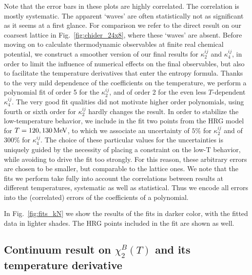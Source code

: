 \documentclass[aps,prd,twocolumn,superscriptaddress]{revtex4-2}
\newcommand{\MeV}{\, {\rm MeV}}
\begin{document}
Note that the error bars in these plots are highly correlated. The correlation
is mostly systematic. The apparent `waves' are often statistically not 
as significant as it seems at a first glance. For comparison we refer to the
direct result on our coarsest lattice in Fig.~\ref{fig:chider_24x8},
where these `waves' are absent.
Before moving on to calculate thermodynamic observables at finite real
chemical potential, we construct a smoother version of our final results for
$\kappa_2^{ij}$ and $\kappa_4^{ij}$, in order to limit the influence of
numerical effects on the final observables, but also to facilitate the
temperature derivatives that enter the entropy formula.
Thanks to the very mild dependence of the coefficients 
on the temperature, we perform a polynomial fit of order 5 for the
$\kappa_2^{ij}$, and of order 2 for the even less $T$-dependent
$\kappa_4^{ij}$. The very good fit qualities did not motivate higher
order polynomials, using fourth or sixth order for $\kappa_2^{ij}$ hardly
changes the result.  In order to stabilize the low-temperature behavior, we
include in the fit two points from the HRG model for $T = 120, 130 \MeV$, to
which we associate an uncertainty of $5\%$ for $\kappa_2^{ij}$ and of $300\%$
for $\kappa_4^{ij}$.  The choice of these particular values for the
uncertainties is uniquely guided by the necessity of placing a constraint on
the low-T behavior, while avoiding to drive the fit too strongly. For this
reason, these arbitrary errors are chosen to be smaller, but comparable to the
lattice ones. We note that the fits we perform take fully into account the
correlations between results at different temperatures, systematic as well as
statistical. Thus we encode all errors into the (correlated) errors of the
coefficients of a polynomial.

In Fig.~\ref{fig:fits_kN} we show the results of the fits in darker color, with 
the fitted data in lighter shades. The HRG points included in the fit are shown as well.

\subsection{Continuum result on $\chi^B_2(T)$ and its temperature derivative}
\end{document}
